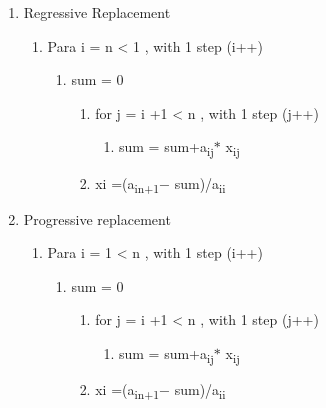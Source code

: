 \documentclass[12pt]{article}
\renewcommand{\_}{\kern-1.5pt\textunderscore\kern-1.5pt}
\begin{document}
\begin{enumerate}
	\item Regressive Replacement \par

\begin{enumerate}
	\item Para i = n < 1 , with 1 step (i++) \par

\begin{enumerate}
	\item sum = 0\par

\begin{enumerate}
	\item for j = i +1 < n , with 1 step (j++) \par

\begin{enumerate}
	\item sum = sum+a\textsubscript{ij}$\ast$ x\textsubscript{ij}\par


\end{enumerate}
	\item xi =(a\textsubscript{in+1}$-$ sum)/a\textsubscript{ii}\par


\end{enumerate}
\end{enumerate}
\end{enumerate}
	\item Progressive replacement \par

\begin{enumerate}
	\item Para i = 1 < n , with 1 step (i++) \par

\begin{enumerate}
	\item sum = 0\par

\begin{enumerate}
	\item for j = i +1 < n , with 1 step (j++) \par

\begin{enumerate}
	\item sum = sum+a\textsubscript{ij}$\ast$ x\textsubscript{ij}\par


\end{enumerate}
	\item xi =(a\textsubscript{in+1}$-$ sum)/a\textsubscript{ii}\par


\vspace{\baselineskip}

\end{enumerate}
\end{enumerate}
\end{enumerate}
\end{enumerate}
\printbibliography
\end{document}

